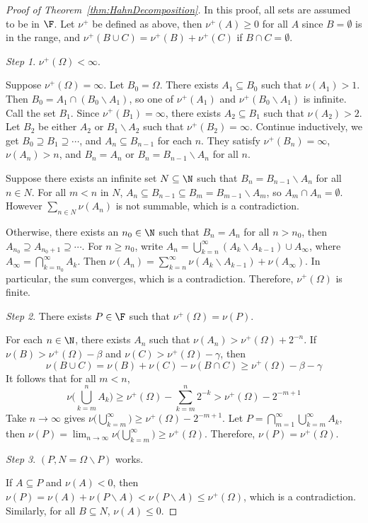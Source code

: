 \documentclass[a4paper]{article}
\begin{document}
\begin{proof}[Proof of Theorem~\ref{thm:HahnDecomposition}]
	In this proof, all sets are assumed to be in $\F$. Let $\nu^+$ be defined as above, then $\nu^+(A)\geq 0$ for all $A$ since $B=\emptyset$ is in the range, and $\nu^+(B\cup C)=\nu^+(B)+\nu^+(C)$ if $B\cap C=\emptyset$.

	\noindent \emph{Step 1}. $\nu^+(\Omega)<\infty$.

	Suppose $\nu^+(\Omega)=\infty$. Let $B_0=\Omega$. There exists $A_1\subseteq B_0$ such that $\nu(A_1)>1$. Then $B_0=A_1\cap(B_0\backslash A_1)$, so one of $\nu^+(A_1)$ and $\nu^+(B_0\backslash A_1)$ is infinite. Call the set $B_1$. Since $\nu^+(B_1)=\infty$, there exists $A_2\subseteq B_1$ such that $\nu(A_2)>2$. Let $B_2$ be either $A_2$ or $B_1\backslash A_2$ such that $\nu^+(B_2)=\infty$. Continue inductively, we get $B_0\supseteq B_1\supseteq\cdots$, and $A_n\subseteq B_{n-1}$ for each $n$. They satisfy $\nu^+(B_n)=\infty$, $\nu(A_n)>n$, and $B_n=A_n$ or $B_n=B_{n-1}\backslash A_n$ for all $n$.

	Suppose there exists an infinite set $N\subseteq\N$ such that $B_n=B_{n-1}\backslash A_n$ for all $n\in N$. For all $m<n$ in $N$, $A_n\subseteq B_{n-1}\subseteq B_m=B_{m-1}\backslash A_m$, so $A_m\cap A_n=\emptyset$. However $\sum_{n\in N}\nu(A_n)$ is not summable, which is a contradiction.

	Otherwise, there exists an $n_0\in\N$ such that $B_n=A_n$ for all $n>n_0$, then $A_{n_0}\supseteq A_{n_0+1}\supseteq\cdots$. For $n\geq n_0$, write $A_n=\bigcup_{k=n}^\infty(A_k\backslash A_{k-1})\cup A_\infty$, where $A_\infty=\bigcap_{k=n_0}^\infty A_k$. Then $\nu(A_n)=\sum_{k=n}^\infty\nu(A_k\backslash A_{k-1})+\nu(A_\infty)$. In particular, the sum converges, which is a contradiction. Therefore, $\nu^+(\Omega)$ is finite.

	\noindent \emph{Step 2}. There exists $P\in\F$ such that $\nu^+(\Omega)=\nu(P)$.

	For each $n\in\N$, there exists $A_n$ such that $\nu(A_n)>\nu^+(\Omega)+2^{-n}$. If $\nu(B)>\nu^+(\Omega)-\beta$ and $\nu(C)>\nu^+(\Omega)-\gamma$, then
	\[
	 \nu(B\cup C)=\nu(B)+\nu(C)-\nu(B\cap C)\geq\nu^+(\Omega)-\beta-\gamma
	\]
	It follows that for all $m<n$,
	\[
	 \nu\bigg(\bigcup_{k=m}^n A_k\bigg)\geq\nu^+(\Omega)-\sum_{k=m}^n 2^{-k}>\nu^+(\Omega)-2^{-m+1}
	\]
	Take $n\to\infty$ gives $\nu\big(\bigcup_{k=m}^\infty\big)\geq\nu^+(\Omega)-2^{-m+1}$. Let $P=\bigcap_{m=1}^\infty\bigcup_{k=m}^\infty A_k$, then $\nu(P)=\lim_{n\to\infty}\nu\big(\bigcup_{k=m}^\infty\big)\geq \nu^+(\Omega)$. Therefore, $\nu(P)=\nu^+(\Omega)$.

	\noindent \emph{Step 3}. $(P,N=\Omega\backslash P)$ works.

	If $A\subseteq P$ and $\nu(A)<0$, then $\nu(P)=\nu(A)+\nu(P\backslash A)<\nu(P\backslash A)\leq\nu^+(\Omega)$, which is a contradiction. Similarly, for all $B\subseteq N$, $\nu(A)\leq 0$.
\end{proof}
\end{document}
